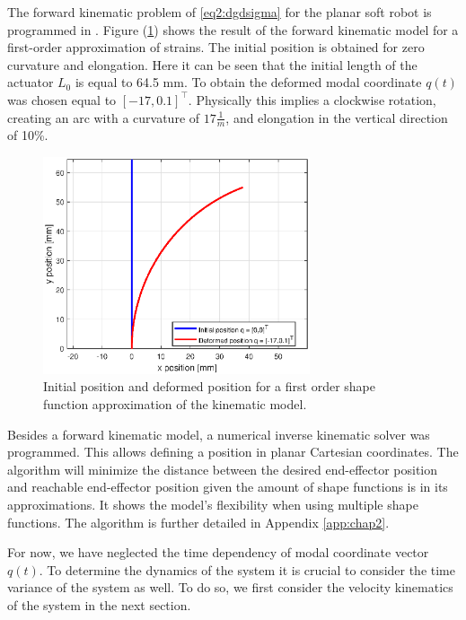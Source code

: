 The forward kinematic problem of \ref{eq2:dgdsigma} for the planar soft robot is programmed in \MATLAB \cite{MATLAB2020}. Figure (\ref{fig1:forward_kinematic}) shows the result of the forward kinematic model for a first-order approximation of strains. The initial position is obtained for zero curvature and elongation. Here it can be seen that the initial length of the actuator $L_0$ is equal to 64.5 mm. To obtain the deformed modal coordinate $q(t)$ was chosen equal to $[-17,0.1]^\top$. Physically this implies a clockwise rotation, creating an arc with a curvature of $17 \frac{1}{m}$, and elongation in the vertical direction of 10\%.


\begin{figure}[H]
    \centering
    \includegraphics[width = 0.7\textwidth]{Figures/Chapter2/fkin1701.eps}
    \caption{Initial position and deformed position for a first order shape function approximation of the kinematic model.}
    \label{fig1:forward_kinematic}
\end{figure}

Besides a forward kinematic model, a numerical inverse kinematic solver was programmed. This allows defining a position in planar Cartesian coordinates. The algorithm will minimize the distance between the desired end-effector position and reachable end-effector position given the amount of shape functions is in its approximations. It shows the model's flexibility when using multiple shape functions. The algorithm is further detailed in Appendix \ref{app:chap2}. 

For now, we have neglected the time dependency of modal coordinate vector $q(t)$. To determine the dynamics of the system it is crucial to consider the time variance of the system as well. To do so, we first consider the velocity kinematics of the system in the next section.


